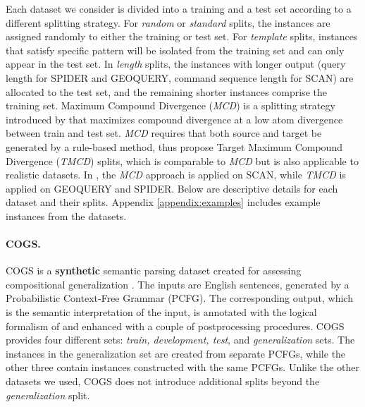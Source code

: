 Each dataset we consider is divided into a training and a test set according to a different splitting strategy. 
For \textit{random} or \textit{standard} splits, the instances are assigned randomly to either the training or test set. 
For \textit{template} splits, instances that satisfy specific pattern will be isolated from the training set and can only appear in the test set. 
In \textit{length} splits, the instances with longer output (query length for SPIDER and GEOQUERY, command sequence length for SCAN) are allocated to the test set, and the remaining shorter instances comprise the training set. 
Maximum Compound Divergence (\textit{MCD}) is a splitting strategy introduced by \cite{keysers2020measuring} that maximizes compound divergence at a low atom divergence between train and test set. 
\textit{MCD} requires that both source and target be generated by a rule-based method, thus \cite{shaw-etal-2021-compositional} propose Target Maximum Compound Divergence (\textit{TMCD}) splits, which is comparable to \textit{MCD} but is also applicable to realistic datasets. In \cite{shaw-etal-2021-compositional}, the \textit{MCD} approach is applied on SCAN, while \textit{TMCD} is applied on GEOQUERY and SPIDER. Below are descriptive details for each dataset and their splits. Appendix \ref{appendix:examples} includes example instances from the datasets.

\vspace{-3mm}
\paragraph{COGS.} COGS is a \textbf{synthetic} semantic parsing dataset created for assessing compositional generalization \cite{kim-linzen-2020-cogs}.
The inputs are English sentences, generated by a Probabilistic Context-Free Grammar (PCFG). 
The corresponding output, which is the semantic interpretation of the input, is annotated with the logical formalism of \citet{reddy-etal-2017-universal} and enhanced with a couple of postprocessing procedures.
COGS provides four different sets: \textit{train, development, test}, and \textit{generalization} sets. The instances in the generalization set are created from separate PCFGs, while the other three contain instances constructed with the same PCFGs. Unlike the other datasets we used, COGS does not introduce additional splits beyond the \textit{generalization} split.

\vspace{-3mm}
